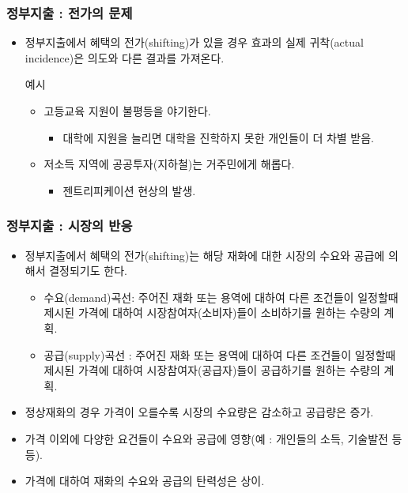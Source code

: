 \documentclass[aspectratio=169,xcolor=dvipsnames,handout]{beamer}
\begin{document}
\begin{frame}[<+->]
\frametitle{정부지출 : 전가의 문제}
    \begin{itemize}
        \item 정부지출에서 혜택의 전가(shifting)가 있을 경우 효과의 실제 귀착(actual incidence)은 의도와 다른 결과를 가져온다.
        \begin{exampleblock}{예시}
            \begin{itemize}
                \item 고등교육 지원이 불평등을 야기한다. 
                \begin{itemize}
                    \item 대학에 지원을 늘리면 대학을 진학하지 못한 개인들이 더 차별 받음.
                \end{itemize}
                \item 저소득 지역에 공공투자(지하철)는 거주민에게 해롭다.
                \begin{itemize}
                    \item 젠트리피케이션 현상의 발생.
                \end{itemize}
            \end{itemize}
        \end{exampleblock}
    \end{itemize}
\end{frame}

\begin{frame}[<+->]
\frametitle{정부지출 : 시장의 반응}
    \begin{itemize}
        \item 정부지출에서 혜택의 전가(shifting)는 해당 재화에 대한 시장의 수요와 공급에 의해서 결정되기도 한다.
            \begin{itemize}
                \item 수요(demand)곡선: 주어진 재화 또는 용역에 대하여 다른 조건들이 일정할때 제시된 가격에 대하여 시장참여자(소비자)들이 소비하기를 원하는 수량의 계획. 
                \item 공급(supply)곡선 : 주어진 재화 또는 용역에 대하여 다른 조건들이 일정할때 제시된 가격에 대하여 시장참여자(공급자)들이 공급하기를 원하는 수량의 계획. 
            \end{itemize}
        \item 정상재화의 경우 가격이 오를수록 시장의 수요량은 감소하고 공급량은 증가. 
        \item 가격 이외에 다양한 요건들이 수요와 공급에 영향(예 : 개인들의 소득, 기술발전 등등).
        \item 가격에 대하여 재화의 수요와 공급의 탄력성은 상이.
    \end{itemize}
\end{frame}
\end{document}
